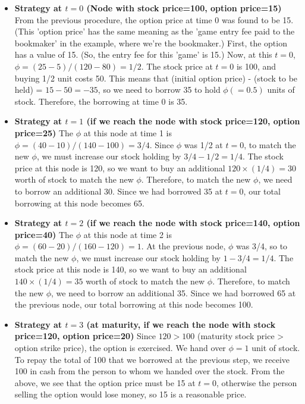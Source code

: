 \documentclass[uplatex,a4j,12pt,dvipdfmx]{jsarticle}
\begin{document}
\begin{itemize}
	\item \textbf{Strategy at $t=0$ (Node with stock price=100, option price=15)}
	      From the previous procedure, the option price at time 0 was found to be 15. (This 'option price' has the same meaning as the 'game entry fee paid to the bookmaker' in the example, where we're the bookmaker.) First, the option has a value of 15. (So, the entry fee for this 'game' is 15.) Now, at this $t=0$, $\phi = (25-5)/(120-80) = 1/2$. The stock price at $t=0$ is 100, and buying 1/2 unit costs 50. This means that (initial option price) - (stock to be held) = $15 - 50 = -35$, so we need to borrow 35 to hold $\phi(=0.5)$ units of stock. Therefore, the borrowing at time 0 is 35.

	\item \textbf{Strategy at $t=1$ (if we reach the node with stock price=120, option price=25)}
	      The $\phi$ at this node at time 1 is $\phi = (40-10)/(140-100) = 3/4$. Since $\phi$ was 1/2 at $t=0$, to match the new $\phi$, we must increase our stock holding by $3/4 - 1/2 = 1/4$. The stock price at this node is 120, so we want to buy an additional $120 \times (1/4) = 30$ worth of stock to match the new $\phi$. Therefore, to match the new $\phi$, we need to borrow an additional 30. Since we had borrowed 35 at $t=0$, our total borrowing at this node becomes 65.

	\item \textbf{Strategy at $t=2$ (if we reach the node with stock price=140, option price=40)}
	      The $\phi$ at this node at time 2 is $\phi = (60-20)/(160-120) = 1$. At the previous node, $\phi$ was 3/4, so to match the new $\phi$, we must increase our stock holding by $1-3/4=1/4$. The stock price at this node is 140, so we want to buy an additional $140 \times (1/4) = 35$ worth of stock to match the new $\phi$. Therefore, to match the new $\phi$, we need to borrow an additional 35. Since we had borrowed 65 at the previous node, our total borrowing at this node becomes 100.

	\item \textbf{Strategy at $t=3$ (at maturity, if we reach the node with stock price=120, option price=20)}
	      Since $120 > 100$ (maturity stock price > option strike price), the option is exercised. We hand over $\phi=1$ unit of stock. To repay the total of 100 that we borrowed at the previous step, we receive 100 in cash from the person to whom we handed over the stock. From the above, we see that the option price must be 15 at $t=0$, otherwise the person selling the option would lose money, so 15 is a reasonable price.
\end{itemize}
\end{document}
